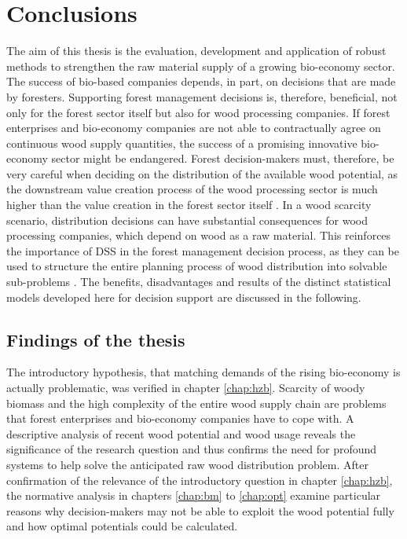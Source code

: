 \chapter{Conclusions}
\label{chap:discussion}
\newpage
\noindent
The aim of this thesis is the evaluation, development and application of robust methods to strengthen the raw material supply of a growing bio-economy sector. The success of bio-based companies depends, in part, on decisions that are made by foresters. Supporting forest management decisions is, therefore, beneficial, not only for the forest sector itself but also for wood processing companies. If forest enterprises and bio-economy companies are not able to contractually agree on continuous wood supply quantities, the success of a promising innovative bio-economy sector might be endangered. Forest decision-makers must, therefore, be very careful when deciding on the distribution of the available wood potential, as the downstream value creation process of the wood processing sector is much higher than the value creation in the forest sector itself \citep[p. 221, 223]{elchichakli_2016}. In a wood scarcity scenario, distribution decisions can have substantial consequences for wood processing companies, which depend on wood as a raw material. This reinforces the importance of DSS in the forest management decision process, as they can be used to structure the entire planning process of wood distribution into solvable sub-problems \citep[p. 1065-1067]{pretzsch_2008}. The benefits, disadvantages and results of the distinct statistical models developed here for decision support are discussed in the following.

\section{Findings of the thesis}
\label{sec:discussion:findings}
The introductory hypothesis, that matching demands of the rising bio-economy is actually problematic, was verified in chapter \ref{chap:hzb}. Scarcity of woody biomass and the high complexity of the entire wood supply chain are problems that forest enterprises and bio-economy companies have to cope with. A descriptive analysis of recent wood potential and wood usage reveals the significance of the research question and thus confirms the need for profound systems to help solve the anticipated raw wood distribution problem. After confirmation of the relevance of the introductory question in chapter \ref{chap:hzb}, the normative analysis in chapters \ref{chap:bm} to \ref{chap:opt} examine particular reasons why decision-makers may not be able to exploit the wood potential fully and how optimal potentials could be calculated.

